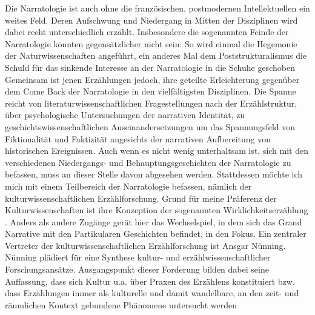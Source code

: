 Die Narratologie ist auch ohne die französischen, postmodernen Intellektuellen
ein weites Feld. Deren Aufschwung und Niedergang in Mitten der Disziplinen wird
dabei recht unterschiedlich erzählt. Insbesondere die sogenannten Feinde der
Narratologie könnten gegensätzlicher nicht sein: So wird einmal die Hegemonie
der Naturwissenschaften\footnotemark {} angeführt, ein anderes Mal dem Poststrukturalismus die
Schuld für das sinkende Interesse an der Narratologie in die Schuhe
geschoben\footnotemark {} Gemeinsam ist jenen Erzählungen jedoch, ihre geteilte Erleichterung
gegenüber dem Come Back der Narratologie in den vielfältigsten Disziplinen. Die
Spanne reicht von literaturwissenschaftlichen Fragestellungen nach der
Erzählstruktur, über psychologische Untersuchungen der narrativen Identität, zu
geschichtswissenschaftlichen Auseinandersetzungen um das Spannungsfeld von
Fiktionalität und Faktizität angesichts der narrativen Aufbereitung von
historischen Ereignissen. Auch wenn es nicht wenig unterhaltsam ist, sich mit
den verschiedenen Niedergangs- und Behauptungsgeschichten der Narratologie zu
befassen, muss an dieser Stelle davon abgesehen werden. Stattdessen möchte ich
mich mit einem Teilbereich der Narratologie befassen, nämlich der
kulturwissenschaftlichen Erzählforschung. Grund für meine Präferenz der
Kulturwissenschaften ist ihre Konzeption der sogenannten
\glqq Wirklichkeitserzählung \grqq \footnotemark {}. Anders als andere Zugänge gerät hier das
Wechselspiel, in dem sich das Grand Narrative mit den Partikularen Geschichten
befindet, in den Fokus. Ein zentraler Vertreter der kulturwissenschaftlichen 
Erzählforschung ist Ansgar Nünning. Nünning plädiert für eine Synthese kultur-
und erzählwissenschaftlicher Forschungsansätze.\footnotemark {}
Ausgangspunkt dieser Forderung
bilden dabei seine Auffassung, dass sich Kultur u.a. über Praxen des Erzählens
konstituiert bzw. dass Erzählungen immer als kulturelle und damit wandelbare,
an den zeit- und räumlichen Kontext gebundene Phänomene untersucht werden
